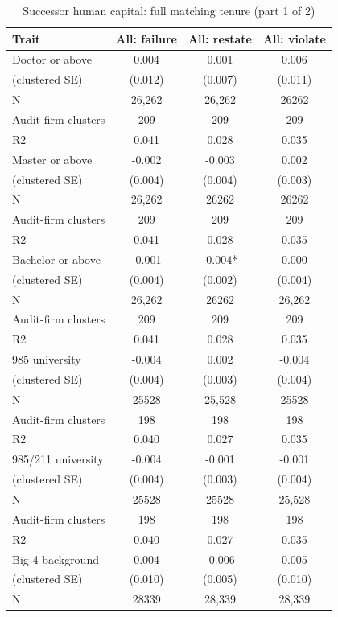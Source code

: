 \begin{table}[htbp]
\footnotesize
\centering
\caption{Successor human capital: full matching tenure (part 1 of 2)}
\begin{threeparttable}
\begin{tabular}{p{}ccc}
\toprule
Trait & All: failure & All: restate & All: violate \\
\midrule
Doctor or above & 0.004 & 0.001 & 0.006 \\
(clustered SE) & (0.012) & (0.007) & (0.011) \\
N & 26,262 & 26,262 & 26262 \\
Audit-firm clusters & 209 & 209 & 209 \\
R2 & 0.041 & 0.028 & 0.035 \\
Master or above & -0.002 & -0.003 & 0.002 \\
(clustered SE) & (0.004) & (0.004) & (0.003) \\
N & 26,262 & 26262 & 26262 \\
Audit-firm clusters & 209 & 209 & 209 \\
R2 & 0.041 & 0.028 & 0.035 \\
Bachelor or above & -0.001 & -0.004* & 0.000 \\
(clustered SE) & (0.004) & (0.002) & (0.004) \\
N & 26,262 & 26262 & 26,262 \\
Audit-firm clusters & 209 & 209 & 209 \\
R2 & 0.041 & 0.028 & 0.035 \\
985 university & -0.004 & 0.002 & -0.004 \\
(clustered SE) & (0.004) & (0.003) & (0.004) \\
N & 25528 & 25,528 & 25528 \\
Audit-firm clusters & 198 & 198 & 198 \\
R2 & 0.040 & 0.027 & 0.035 \\
985/211 university & -0.004 & -0.001 & -0.001 \\
(clustered SE) & (0.004) & (0.003) & (0.004) \\
N & 25528 & 25528 & 25,528 \\
Audit-firm clusters & 198 & 198 & 198 \\
R2 & 0.040 & 0.027 & 0.035 \\
Big 4 background & 0.004 & -0.006 & 0.005 \\
(clustered SE) & (0.010) & (0.005) & (0.010) \\
N & 28339 & 28,339 & 28,339 \\

\end{tabular}
\end{threeparttable}
\end{table}

